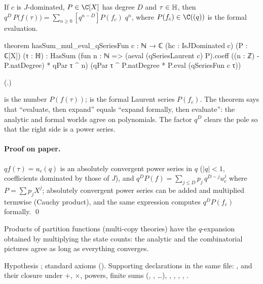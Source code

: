 \begin{theorem}\label{ch19:thm:polyq}
If $c$ is $J$-dominated, $P\in\C[X]$ has degree $D$ and $\tau\in\mathbb{H}$, then
$q^D\,P\bigl(f(\tau)\bigr)=\sum_{n\ge0}[q^{n-D}]P(f_c)\;q^n$, where $P(f_c)\in\C((q))$ is the formal evaluation.
\end{theorem}
\begin{leancode}
theorem hasSum_mul_eval_qSeriesFun {c : ℕ → ℂ} (hc : IsJDominated c) (P : ℂ[X]) (τ : ℍ) :
    HasSum (fun n : ℕ => (aeval (qSeriesLaurent c) P).coeff ((n : ℤ) - P.natDegree) * qPar τ ^ n)
      (qPar τ ^ P.natDegree * P.eval (qSeriesFun c τ))
\end{leancode}
(.)
\begin{dictionary}
 is the number $P(f(\tau))$;  is the formal Laurent series
$P(f_c)$.  The theorem says that ``evaluate, then expand'' equals ``expand formally, then evaluate'': the analytic and
formal worlds agree on polynomials.  The factor $q^D$ clears the pole so that the right side is a power series.
\end{dictionary}
\paragraph{Proof on paper.}  $q f(\tau)=u_c(q)$ is an absolutely convergent power series in $q$ ($|q|<1$, coefficients
dominated by those of $J$), and $q^DP(f)=\sum_{j\le D}p_j\,q^{D-j}u_c^j$ where $P=\sum p_jX^j$; absolutely convergent power
series can be added and multiplied termwise (Cauchy product), and the same expression computes $q^DP(f_c)$ formally.
\qed
\begin{physics}
Products of partition functions (multi-copy theories) have the $q$-expansion obtained by multiplying the state counts:
the analytic and the combinatorial pictures agree as long as everything converges.
\end{physics}
\begin{status}
Hypothesis ; standard axioms ().  Supporting declarations in the same
file: ,  and their closure under $+$, $\times$, powers, finite sums
(, , \dots), ,
, , ,
.
\end{status}

